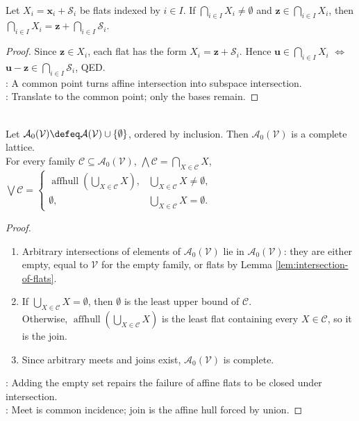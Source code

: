 \begin{lemma} \label{lem:intersection-of-flats} \\
Let $X_i=\mathbf{x}_i+\mathcal{S}_i$ be flats indexed by $i\in I$. If $\bigcap\limits_{i\in I}X_i\neq\emptyset$ and $\mathbf{z}\in\bigcap\limits_{i\in I}X_i$, then $\bigcap\limits_{i\in I}X_i=\mathbf{z}+\bigcap\limits_{i\in I}\mathcal{S}_i$.
\begin{proof}
Since $\mathbf{z}\in X_i$, each flat has the form $X_i=\mathbf{z}+\mathcal{S}_i$. Hence $\mathbf{u}\in\bigcap\limits_{i\in I}X_i$ $\iff$ $\mathbf{u}-\mathbf{z}\in\bigcap\limits_{i\in I}\mathcal{S}_i$, QED.\\
: A common point turns affine intersection into subspace intersection.\\
: Translate to the common point; only the bases remain.
\end{proof}
\end{lemma}

\begin{theorem} \label{thm:lattice-of-flats} \\
Let $\mathcal{A}_0(\mathcal{V})\defeq\mathcal{A}(\mathcal{V})\cup\{\emptyset\}$, ordered by inclusion. Then $\mathcal{A}_0(\mathcal{V})$ is a complete lattice.\\
For every family $\mathcal{C}\subseteq\mathcal{A}_0(\mathcal{V})$, $\bigwedge\mathcal{C}=\bigcap\limits_{X\in\mathcal{C}}X$, $\bigvee\mathcal{C}=
\begin{cases}
\operatorname{affhull}\left(\bigcup\limits_{X\in\mathcal{C}}X\right), & \bigcup\limits_{X\in\mathcal{C}}X\neq\emptyset,\\
\emptyset, & \bigcup\limits_{X\in\mathcal{C}}X=\emptyset.
\end{cases}$
\begin{proof}
\begin{enumerate}[label=(\roman*)]
\setlength{\itemsep}{0pt}
\item Arbitrary intersections of elements of $\mathcal{A}_0(\mathcal{V})$ lie in $\mathcal{A}_0(\mathcal{V})$: they are either empty, equal to $\mathcal{V}$ for the empty family, or flats by Lemma \ref{lem:intersection-of-flats}.
\item If $\bigcup\limits_{X\in\mathcal{C}}X=\emptyset$, then $\emptyset$ is the least upper bound of $\mathcal{C}$.\\
Otherwise, $\operatorname{affhull}(\bigcup\limits_{X\in\mathcal{C}}X)$ is the least flat containing every $X\in\mathcal{C}$, so it is the join.
\item Since arbitrary meets and joins exist, $\mathcal{A}_0(\mathcal{V})$ is complete.
\end{enumerate}
: Adding the empty set repairs the failure of affine flats to be closed under intersection.\\
: Meet is common incidence; join is the affine hull forced by union.
\end{proof}
\end{theorem}

